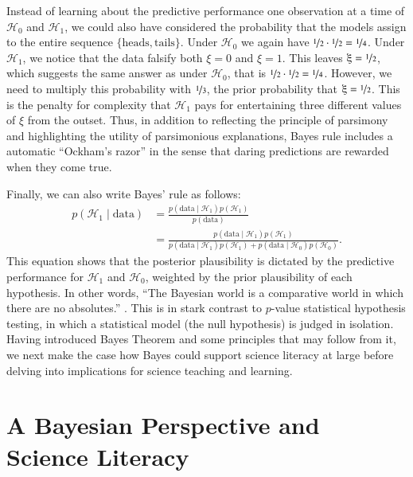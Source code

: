 \documentclass[man]{apa7}
\begin{document}
Instead of learning about the predictive performance one observation at a time of $\mathcal{H}_0$ and $\mathcal{H}_1$, we could also have considered the probability that the models assign to the entire sequence $\{\text{heads}, \text{tails}\}$. Under $\mathcal{H}_0$ we again have $\nicefrac{1}{2} \cdot \nicefrac{1}{2} = \nicefrac{1}{4}$. Under $\mathcal{H}_1$, we notice that the data falsify both $\xi=0$ and $\xi=1$. This leaves $\xi=\nicefrac{1}{2}$, which suggests the same answer as under $\mathcal{H}_0$, that is $\nicefrac{1}{2} \cdot \nicefrac{1}{2} = \nicefrac{1}{4}$. However, we need to multiply this probability with $\nicefrac{1}{3}$, the prior probability that $\xi=\nicefrac{1}{2}$. This is the penalty for complexity that $\mathcal{H}_1$ pays for entertaining three different values of $\xi$ from the outset. Thus, in addition to reflecting the principle of parsimony and highlighting the utility of parsimonious explanations, Bayes rule includes a automatic ``Ockham's razor'' \parencite{Jeffreys1939,JefferysBerger1992} in the sense that daring predictions are rewarded when they come true.

Finally, we can also write Bayes' rule as follows:
\begin{equation}
\begin{split}
    p(\mathcal{H}_1 \mid \text{data})& = \frac{p(\text{data} \mid \mathcal{H}_1) p(\mathcal{H}_1)}{p(\text{data})}\\
    & = \frac{p(\text{data} \mid \mathcal{H}_1) p(\mathcal{H}_1)}{p(\text{data} \mid \mathcal{H}_1) p(\mathcal{H}_1) + p(\text{data} \mid \mathcal{H}_0) p(\mathcal{H}_0)}.
\end{split}
\end{equation}
This equation shows that the posterior plausibility is dictated by the predictive performance for $\mathcal{H}_1$ and $\mathcal{H}_0$, weighted by the prior plausibility of each hypothesis. In other words, ``The Bayesian world is a comparative world in which there are no absolutes.'' \parencite[p. 308]{Lindley2000}. This is in stark contrast to $p$-value statistical hypothesis testing, in which a statistical model (the null hypothesis) is judged in isolation. 
Having introduced Bayes Theorem and some principles that may follow from it, we next make the case how Bayes could support science literacy at large before delving into implications for science teaching and learning.

\section{A Bayesian Perspective and Science Literacy}
\end{document}
